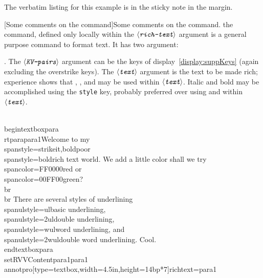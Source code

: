 \documentclass[12pt]{article}
\makeatletter
\let\opt\texttt
\def\ameta#1{$\langle\textit{\texttt{#1}}\rangle$}
\def\darg#1{\texttt{\{#1\}}}
\renewenvironment{quote}[1][]
   {\def\@rgi{#1}\ifx\@rgi\@empty
    \let\rghtm\@empty\else\def\rghtm{\rightmargin\leftmargin}\fi
    \list{}{\rghtm} %
    \item\relax}
   {\endlist}
\renewcommand*{\theparagraph}{\texorpdfstring{\protect\P\protect\ }{\textparagraph}}
\renewcommand{\paragraph}
    {\renewcommand{\@seccntformat}[1]{\theparagraph}%
    \@startsection{paragraph}{4}{0pt}{6pt}{-3pt}{\color{\aeb@subsubsectioncolor}\bfseries}}
\def\chgCurrLblName#1{\def\@currentlabelname{#1}}
\makeatother
\begin{document}
\begin{quote}
\begin{textboxpara}
\end{textboxpara}
%
\annotpro[margin,readonly,margintext={\centering The Code}]{\annotextboxi}%
\end{quote}
The verbatim listing for this example is in the sticky note in the margin.

\paragraph[Some comments on the \texorpdfstring{\protect{}}{\textbackslash{span}}
command]{Some comments on the  command.}\chgCurrLblName{Some comments on the \cs{span} command}\label{para:Span}
the  command, defined only locally within the \ameta{rich-text} argument  is a general purpose
command to format text. It has two argument:
\begin{quote}
\cs{span\darg{\ameta{KV-pairs}}\darg{\ameta{text}}}.
\end{quote}
The \ameta{KV-pairs} argument can be the keys of
display~\eqref{display:suppKeys} (again excluding the overstrike keys). The \ameta{text} argument is the
text to be made rich; experience shows that , ,  and  may be used within
\ameta{text}. Italic and bold may be accomplished using the \opt{style} key, probably preferred over
using  and  within \ameta{text}.
\begin{defineJS}{\annotextboxi}
\\begin{textboxpara}
\\rtpara{para1}{Welcome to my \\span{style={strikeit,bold}}{poor}\\span{style=bold}{rich text world}.
We add a little color shall we try \\span{color=FF0000}{red} or \\span{color=00FF00}{green}?\\br\\br
There are several styles of underlining \\span{ulstyle=ul}{basic underlining},
\\span{ulstyle=2ul}{double underlining}, \\span{ulstyle=wul}{word underlining}, and
\\span{ulstyle=2wul}{double word underlining}. Cool.}
\\end{textboxpara}
\\setRVVContent{para1}{para1}
\\annotpro[type=textbox,width=4.5in,height=14bp*7]{richtext=para1}
\end{defineJS}
\end{document}
